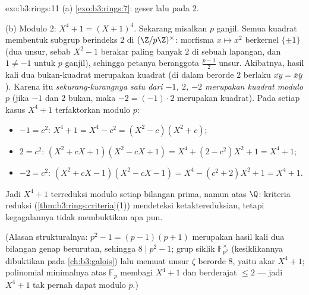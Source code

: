\begin{solution}{exo:b3:rings:11}
(a) \cref{exo:b3:rings:7}: geser lalu  pada $2$.

(b) Modulo $2$: $X^4 + 1 = (X + 1)^4$. Sekarang misalkan $p$ ganjil. Semua
kuadrat membentuk subgrup berindeks $2$ di $(\Z/p\Z)^\times$:
morfisma $x \mapsto x^2$ berkernel $\{\pm 1\}$ (dua unsur, sebab $X^2
- 1$ berakar paling banyak $2$ di sebuah lapangan, dan $1 \neq -1$ untuk $p$
ganjil), sehingga petanya beranggota $\frac{p-1}2$ unsur. Akibatnya,
hasil kali dua bukan-kuadrat merupakan kuadrat (di dalam 
berorde $2$ berlaku $\overline{xy} = \bar x\bar y$). Karena itu \emph{sekurang-kurangnya satu
dari $-1$, $2$, $-2$ merupakan kuadrat modulo $p$} (jika $-1$ dan $2$ bukan,
maka $-2 = (-1)\cdot 2$ merupakan kuadrat). Pada setiap kasus $X^4 + 1$ terfaktorkan modulo $p$:
\begin{itemize}
  \item $-1 = c^2$: \quad $X^4 + 1 = X^4 - c^2 = (X^2 - c)(X^2 +
        c)$;
  \item $2 = c^2$: \quad $(X^2 + cX + 1)(X^2 - cX + 1) = X^4 + (2
        - c^2)X^2 + 1 = X^4 + 1$;
  \item $-2 = c^2$: \quad $(X^2 + cX - 1)(X^2 - cX - 1) = X^4 -
        (c^2 + 2)X^2 + 1 = X^4 + 1$.
\end{itemize}
Jadi $X^4+1$ terreduksi modulo setiap bilangan prima, namun  atas
$\Q$: kriteria reduksi (\cref{thm:b3:rings:criteria}(1))
mendeteksi ketaktereduksian, tetapi kegagalannya tidak membuktikan apa pun.

(Alasan strukturalnya: $p^2 - 1 = (p-1)(p+1)$ merupakan hasil kali
dua bilangan genap berurutan, sehingga $8 \mid p^2 - 1$; grup siklik
$\mathbb F_{p^2}^\times$ (kesiklikannya dibuktikan pada
\cref{ch:b3:galois}) lalu memuat unsur $\zeta$ berorde
$8$, yaitu akar $X^4 + 1$; polinomial minimalnya atas $\mathbb
F_p$ membagi $X^4+1$ dan berderajat $\leq 2$ --- jadi $X^4+1$ tak pernah
dapat  modulo $p$.)
\end{solution}

